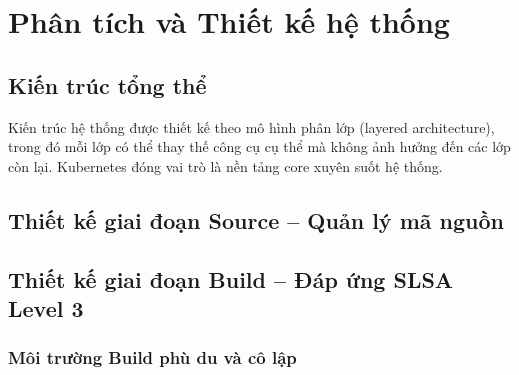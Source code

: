 \chapter{Phân tích và Thiết kế hệ thống}\label{ch:design}

\section{Kiến trúc tổng thể}


Kiến trúc hệ thống được thiết kế theo mô hình phân lớp (layered architecture), trong đó mỗi lớp có thể thay thế công cụ cụ thể mà không ảnh hưởng đến các lớp còn lại. Kubernetes đóng vai trò là nền tảng core xuyên suốt hệ thống.


\section{Thiết kế giai đoạn Source -- Quản lý mã nguồn}


\section{Thiết kế giai đoạn Build -- Đáp ứng SLSA Level 3}

\subsection{Môi trường Build phù du và cô lập}

